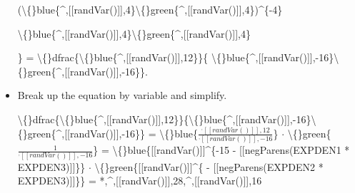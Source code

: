 \documentclass{article}
\begin{document}
\begin{itemize}
                                (\textbackslash\{\}blue\{\textasciicircum{},[[randVar()]],4\}\textbackslash\{\}green\{\textasciicircum{},[[randVar()]],4\})\textasciicircum{}\{-4\}
                            
                            
                                \textbackslash\{\}blue\{\textasciicircum{},[[randVar()]],4\}\textbackslash\{\}green\{\textasciicircum{},[[randVar()]],4\}
                            
                            \} = \textbackslash\{\}dfrac\{\textbackslash\{\}blue\{\textasciicircum{},[[randVar()]],12\}\}\{
                            \textbackslash\{\}blue\{\textasciicircum{},[[randVar()]],-16\}\textbackslash\{\}green\{\textasciicircum{},[[randVar()]],-16\}\}.
  \item Break up the equation by variable and simplify.
                        
                            \textbackslash\{\}dfrac\{\textbackslash\{\}blue\{\textasciicircum{},[[randVar()]],12\}\}\{\textbackslash\{\}blue\{\textasciicircum{},[[randVar()]],-16\}\textbackslash\{\}green\{\textasciicircum{},[[randVar()]],-16\}\} =
                            \textbackslash\{\}blue\{$\frac{^,[[randVar()]],12}{^,[[randVar()]],-16}$\} $\cdot$ \textbackslash\{\}green\{$\frac{1}{^,[[randVar()]],-16}$\} =
                            \textbackslash\{\}blue\{[[randVar()]]\textasciicircum{}\{-15 - [[negParens(EXPDEN1 * EXPDEN3)]]\}\} $\cdot$
                            \textbackslash\{\}green\{[[randVar()]]\textasciicircum{}\{ - [[negParens(EXPDEN2 * EXPDEN3)]]\}\} = 
                            *,\textasciicircum{},[[randVar()]],28,\textasciicircum{},[[randVar()]],16
\end{itemize}
\end{document}
